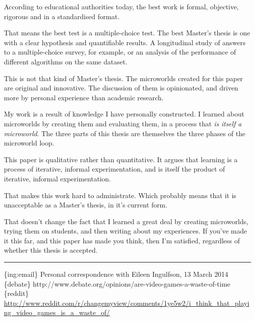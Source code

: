 According to educational authorities today, the best work is formal, objective, rigorous and in a standardised format. 

That means the best test is a multiple-choice test. The best Master's thesis is one with a clear hypothesis and quantifiable results. A longitudinal study of answers to a multiple-choice survey, for example, or an analysis of the performance of different algorithms on the same dataset.

This is not that kind of Master's thesis. The microworlds created for this paper are original and innovative. The discussion of them is opinionated, and driven more by personal experience than academic research. 

My work is a result of knowledge I have personally constructed. I learned about microworlds by creating them and evaluating them, in a process that \textit{is itself a microworld}. The three parts of this thesis are themselves the three phases of the microworld loop.

This paper is qualitative rather than quantitative. It argues that learning is a process of iterative, informal experimentation, and is itself the product of iterative, informal experimentation. 

That makes this work hard to administrate. Which probably means that it is unacceptable as a Master's thesis, in it's current form.

That doesn't change the fact that I learned a great deal by creating microworlds, trying them on students, and then writing about my experiences. If you've made it this far, and this paper has made you think, then I'm satisfied, regardless of whether this thesis is accepted. 

\begin{center}\rule{3in}{0.4pt}\end{center}

\{ing:email\} Personal correspondence with Eileen Ingulfson, 13 March
2014 \{debate\}
http://www.debate.org/opinions/are-video-games-a-waste-of-time
\{reddit\}
\href{\%5D}{http://www.reddit.com/r/changemyview/comments/1ye5w2/i\_think\_that\_playing\_video\_games\_is\_a\_waste\_of/}
